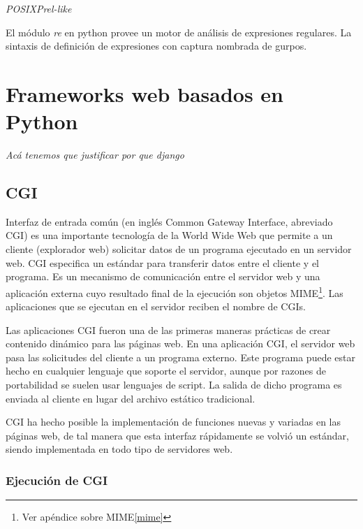 \documentclass[a4paper]{report}
\begin{document}
\emph{POSIX}\emph{Prel-like}

El módulo \emph{re} en python provee un motor de análisis de expresiones regulares.
La sintaxis de definición de expresiones con captura nombrada de gurpos.



\section{Frameworks web basados en Python}
\emph{Acá tenemos que justificar por que django}
\subsection{CGI}
Interfaz de entrada común (en inglés Common Gateway Interface, abreviado CGI) es
una importante tecnología de la World Wide Web que permite a un cliente
(explorador web) solicitar datos de un programa ejecutado en un servidor web.
CGI especifica un estándar para transferir datos entre el cliente y el programa.
Es un mecanismo de comunicación entre el servidor web y una aplicación externa
cuyo resultado final de la ejecución son objetos MIME\footnote{Ver apéndice sobre MIME\ref{mime}}.
Las aplicaciones que se ejecutan en el servidor reciben el nombre de CGIs.


Las aplicaciones CGI fueron una de las primeras maneras prácticas de crear
contenido dinámico para las páginas web. En una aplicación CGI, el servidor web
pasa las solicitudes del cliente a un programa externo. Este programa puede
estar hecho en cualquier lenguaje que soporte el servidor, aunque por razones de
portabilidad se suelen usar lenguajes de script. La salida de dicho programa es
enviada al cliente en lugar del archivo estático tradicional.

CGI ha hecho posible la implementación de funciones nuevas y variadas en las
páginas web, de tal manera que esta interfaz rápidamente se volvió un estándar,
siendo implementada en todo tipo de servidores web.
\subsubsection*{Ejecución de CGI}
\end{document}

